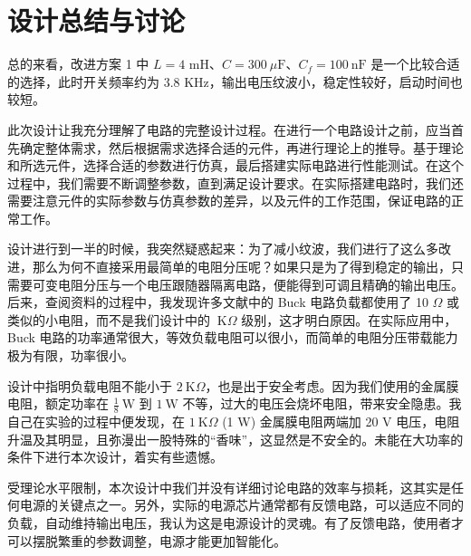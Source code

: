 \documentclass[UTF8]{article}
\def\kO{\ \mathrm{K}\Omega}
\def\KO{\ \mathrm{K}\Omega}
\def\uF{\ \mu\mathrm{F}}
\def\nF{\ \mathrm{nF}}
\def\kO{\ \mathrm{K}\Omega}
\def\KO{\ \mathrm{K}\Omega}
\def\uF{\ \mu\mathrm{F}}
\theoremstyle{MyLineTheoremStyle} %
\theoremstyle{MyBlockTheoremStyle} %
\theoremstyle{MySubsubsectionStyle} %
\begin{document}
\section{设计总结与讨论}
总的来看，改进方案 1 中 $L = 4 $ mH、$C = 300 \uF$、$C_f = 100 \nF$ 是一个比较合适的选择，此时开关频率约为 3.8 KHz，输出电压纹波小，稳定性较好，启动时间也较短。

此次设计让我充分理解了电路的完整设计过程。在进行一个电路设计之前，应当首先确定整体需求，然后根据需求选择合适的元件，再进行理论上的推导。基于理论和所选元件，选择合适的参数进行仿真，最后搭建实际电路进行性能测试。在这个过程中，我们需要不断调整参数，直到满足设计要求。在实际搭建电路时，我们还需要注意元件的实际参数与仿真参数的差异，以及元件的工作范围，保证电路的正常工作。

设计进行到一半的时候，我突然疑惑起来：为了减小纹波，我们进行了这么多改进，那么为何不直接采用最简单的电阻分压呢？如果只是为了得到稳定的输出，只需要可变电阻分压与一个电压跟随器隔离电路，便能得到可调且精确的输出电压。后来，查阅资料的过程中，我发现许多文献中的 Buck 电路负载都使用了 10 $\Omega$ 或类似的小电阻，而不是我们设计中的 $\kO$ 级别，这才明白原因。在实际应用中，Buck 电路的功率通常很大，等效负载电阻可以很小，而简单的电阻分压带载能力极为有限，功率很小。

设计中指明负载电阻不能小于 $2 \kO$，也是出于安全考虑。因为我们使用的金属膜电阻，额定功率在 $\frac{1}{8} \ \mathrm{W}$ 到 $1 \ \mathrm{W}$ 不等，过大的电压会烧坏电阻，带来安全隐患。我自己在实验的过程中便发现，在 $1 \KO$ (1 W) 金属膜电阻两端加 20 V 电压，电阻升温及其明显，且弥漫出一股特殊的“香味”，这显然是不安全的。未能在大功率的条件下进行本次设计，着实有些遗憾。

受理论水平限制，本次设计中我们并没有详细讨论电路的效率与损耗，这其实是任何电源的关键点之一。另外，实际的电源芯片通常都有反馈电路，可以适应不同的负载，自动维持输出电压，我认为这是电源设计的灵魂。有了反馈电路，使用者才可以摆脱繁重的参数调整，电源才能更加智能化。


\nocite{*}

\thispagestyle{fancy} 











\newpage
\appendix
\titleformat{\section}[hang]{\normalfont\huge\bfseries\centering}{}{20pt}{}
\titlespacing*{\section}{0pt}{-25pt}{8pt} %
\titleformat{\subsection}[hang]{\normalfont\centering\Large\bfseries}{\thesubsection}{8pt}{}
\end{document}
